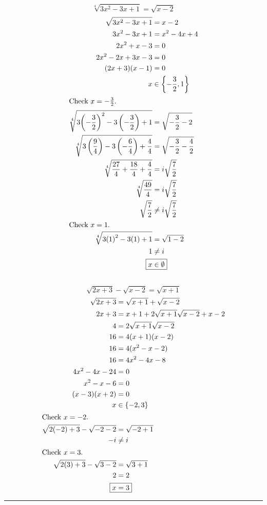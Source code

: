 	\subsection{}
		\[\sqrt[4]{3x^2 - 3x + 1} = \sqrt{x - 2}\]
		\begin{align*}
			\sqrt{3x^2 - 3x + 1} &= x - 2 \\
			3x^2 - 3x + 1 &= x^2 - 4x + 4 \\
			2x^2 + x - 3 &= 0 \\
			2x^2 - 2x + 3x - 3 &= 0 \\
			(2x + 3)(x - 1) &= 0 \\
			x &\in \left\{-\frac{3}{2}, 1\right\} \\
			\intertext{Check $x = -\frac{3}{2}$.}
			\sqrt[4]{3{\left(-\frac{3}{2}\right)}^2 - 3\left(-\frac{3}{2}\right) + 1} &= \sqrt{-\frac{3}{2} - 2} \\
			\sqrt[4]{3\left(\frac{9}{4}\right) - 3\left(-\frac{6}{4}\right) + \frac{4}{4}} &= \sqrt{-\frac{3}{2} - \frac{4}{2}} \\
			\sqrt[4]{\frac{27}{4} + \frac{18}{4} + \frac{4}{4}} &= i\sqrt{\frac{7}{2}} \\
			\sqrt[4]{\frac{49}{4}} &= i\sqrt{\frac{7}{2}} \\
			\sqrt{\frac{7}{2}} &\neq i\sqrt{\frac{7}{2}} \\
			\intertext{Check $x = 1$.}
			\sqrt[4]{3{(1)}^2 - 3(1) + 1} &= \sqrt{1 - 2} \\
			1 &\neq i \\
			\Aboxed{x &\in \emptyset}
		\end{align*}
		\pagebreak{}

	\subsection{}
		\[\sqrt{2x + 3} - \sqrt{x - 2} = \sqrt{x + 1}\]
		\begin{align*}
			\sqrt{2x + 3} &= \sqrt{x + 1} + \sqrt{x - 2} \\
			2x + 3 &= x + 1 + 2\sqrt{x + 1}\sqrt{x - 2} + x - 2 \\
			4 &= 2\sqrt{x + 1}\sqrt{x - 2} \\
			16 &= 4(x + 1)(x - 2) \\
			16 &= 4(x^2 - x - 2) \\
			16 &= 4x^2 - 4x - 8 \\
			4x^2 - 4x - 24 &= 0 \\
			x^2 - x - 6 &= 0 \\
			(x - 3)(x + 2) &= 0 \\
			x &\in \{-2, 3\} \\
			\intertext{Check $x = -2$.}
			\sqrt{2(-2) + 3} - \sqrt{-2 - 2} &= \sqrt{-2 + 1} \\
			-i &\neq i \\
			\intertext{Check $x = 3$.}
			\sqrt{2(3) + 3} - \sqrt{3 - 2} &= \sqrt{3 + 1} \\
			2 &= 2 \\
			\Aboxed{x &= 3}
		\end{align*}
		\hrule{}

